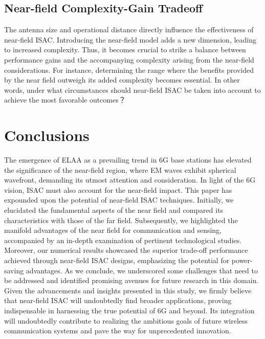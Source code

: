 \documentclass[10pt,journal,twocolumn,twoside]{IEEEtran} %
\begin{document}
\subsection{Near-field Complexity-Gain Tradeoff}
The antenna size and operational distance directly influence the effectiveness of near-field ISAC. Introducing the near-field model adds a new dimension, leading to increased complexity. Thus, it becomes crucial to strike a balance between performance gains and the accompanying complexity arising from the near-field considerations. For instance, determining the range where the benefits provided by the near field outweigh its added complexity becomes essential. In other words, under what circumstances should near-field ISAC be taken into account to achieve the most favorable outcomes？


\section{Conclusions}
The emergence of ELAA as a prevailing trend in 6G base stations has elevated the significance of the near-field region, where EM waves exhibit spherical wavefront, demanding its utmost attention and consideration. In light of the 6G vision, ISAC must also account for the near-field impact. This paper has expounded upon the potential of near-field ISAC techniques. Initially, we elucidated the fundamental aspects of the near field and compared its characteristics with those of the far field. Subsequently, we highlighted the manifold advantages of the near field for communication and sensing, accompanied by an in-depth examination of pertinent technological studies.
Moreover, our numerical results showcased the superior trade-off performance achieved through near-field ISAC designs, emphasizing the potential for power-saving advantages. As we conclude, we underscored some challenges that need to be addressed and identified promising avenues for future research in this domain.
Given the advancements and insights presented in this study, we firmly believe that near-field ISAC will undoubtedly find broader applications, proving indispensable in harnessing the true potential of 6G and beyond. Its integration will undoubtedly contribute to realizing the ambitious goals of future wireless communication systems and pave the way for unprecedented innovation.
 

\end{document}
